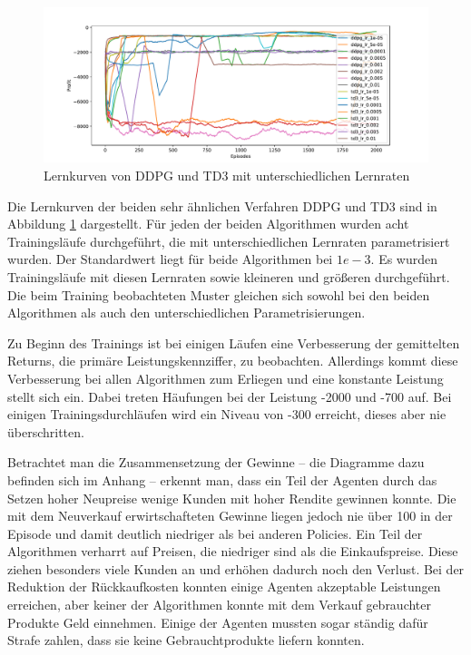 \begin{figure}[htbp]
	\centering
	\includegraphics[width=\textwidth]{main/DDPG_learning_curve.pdf}
	\caption{Lernkurven von DDPG und TD3 mit unterschiedlichen Lernraten}
	\label{grafic:DDPGLearningCurve}
\end{figure}

Die Lernkurven der beiden sehr ähnlichen Verfahren DDPG und TD3 sind in Abbildung \ref{grafic:DDPGLearningCurve} dargestellt.
Für jeden der beiden Algorithmen wurden acht Trainingsläufe durchgeführt, die mit unterschiedlichen Lernraten parametrisiert wurden.
Der Standardwert liegt für beide Algorithmen bei $1e-3$.
Es wurden Trainingsläufe mit diesen Lernraten sowie kleineren und größeren durchgeführt.
Die beim Training beobachteten Muster gleichen sich sowohl bei den beiden Algorithmen als auch den unterschiedlichen Parametrisierungen.

Zu Beginn des Trainings ist bei einigen Läufen eine Verbesserung der gemittelten Returns, die primäre Leistungskennziffer, zu beobachten.
Allerdings kommt diese Verbesserung bei allen Algorithmen zum Erliegen und eine konstante Leistung stellt sich ein.
Dabei treten Häufungen bei der Leistung -2000 und -700 auf.
Bei einigen Trainingsdurchläufen wird ein Niveau von -300 erreicht, dieses aber nie überschritten.

Betrachtet man die Zusammensetzung der Gewinne -- die Diagramme dazu befinden sich im Anhang -- erkennt man, dass ein Teil der Agenten durch das Setzen hoher Neupreise wenige Kunden mit hoher Rendite gewinnen konnte.
Die mit dem Neuverkauf erwirtschafteten Gewinne liegen jedoch nie über 100 in der Episode und damit deutlich niedriger als bei anderen Policies.
Ein Teil der Algorithmen verharrt auf Preisen, die niedriger sind als die Einkaufspreise.
Diese ziehen besonders viele Kunden an und erhöhen dadurch noch den Verlust.
Bei der Reduktion der Rückkaufkosten konnten einige Agenten akzeptable Leistungen erreichen, aber keiner der Algorithmen konnte mit dem Verkauf gebrauchter Produkte Geld einnehmen.
Einige der Agenten mussten sogar ständig dafür Strafe zahlen, dass sie keine Gebrauchtprodukte liefern konnten.

